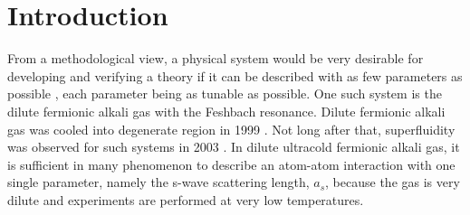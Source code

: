 
\chapter{Introduction}
From  a methodological view, a physical system  would be very desirable for developing and  verifying a theory  if  it can be described with  as few parameters as possible ,  each parameter being as tunable as possible. One such system is the dilute fermionic alkali gas with the Feshbach resonance.  Dilute fermionic alkali gas was cooled into degenerate region in 1999 \cite{DeMarco1999}. Not long after that,  superfluidity was observed for such systems in 2003 \cite{Regal2003}.  In dilute ultracold fermionic alkali gas, it is sufficient in many phenomenon to describe an atom-atom interaction with one single parameter, namely the s-wave scattering length, $a_{s}$, because the gas is very dilute and experiments are performed at very low temperatures.       


